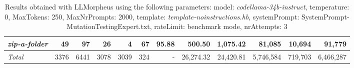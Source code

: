 \begin{table*}
{\begin{tabular}{l||r|r|r|r|r|r||r|r||r|r|r}
   \hline
   \textit{zip-a-folder} & 49 & 97 & 26 & 4 & 67 & 95.88 & 500.50 & 1,075.42 & 81,085 & 10,694 & 91,779 \\ 
   \hline
   \textit{Total} & 3376 & 6441 & 3078 & 3039 & 324 & - & 26,274.32  & 24,420.81 & 5,746,584 & 719,703 & 6,466,287 \\ 
 \end{tabular}
 }
 \caption{Results obtained with LLMorpheus using the following parameters: 
   model: \textit{codellama-34b-instruct}, 
   temperature: 0, 
   MaxTokens: 250, 
   MaxNrPrompts: 2000, 
   template: \textit{template-noinstructions.hb}, 
   systemPrompt: SystemPrompt-MutationTestingExpert.txt, 
   rateLimit: benchmark mode, 
   nrAttempts: 3  
 }
\end{table*}

